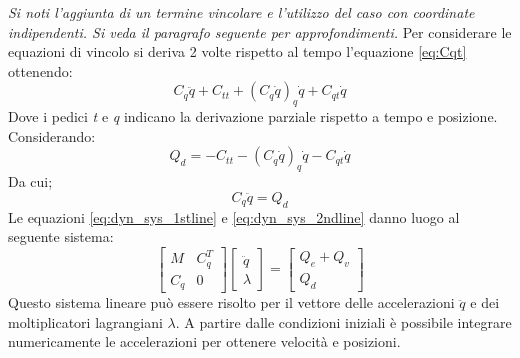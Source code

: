 \textit{Si noti l'aggiunta di un termine vincolare e l'utilizzo del caso con coordinate indipendenti. Si veda il paragrafo seguente per approfondimenti.} \newline
Per considerare le equazioni di vincolo si deriva 2 volte rispetto al tempo l'equazione \ref{eq:Cqt} ottenendo:
\[C_q\ddot{q} + C_{tt} + (C_q\dot{q})_q\dot{q} + C_{qt}\dot{q}\]
Dove i pedici \emph{t} e \emph{q} indicano la derivazione parziale rispetto a tempo e posizione.
Considerando:
\begin{equation} \label{eq:Qd}
Q_d = - C_{tt} - (C_q\dot{q})_q\dot{q} - C_{qt}\dot{q}
\end{equation}
Da cui;
\begin{equation} \label{eq:dyn_sys_2ndline}
C_q\ddot{q} = Q_d
\end{equation}
Le equazioni \ref{eq:dyn_sys_1stline} e \ref{eq:dyn_sys_2ndline} danno luogo al seguente sistema:
\begin{equation} \label{eq:dyn_sys}
\begin{bmatrix} M & C_q^T \\ C_q & 0 \end{bmatrix}
\begin{bmatrix} \ddot{q}\\ \lambda \end{bmatrix} = 
\begin{bmatrix}
Q_e + Q_v \\ Q_d
\end{bmatrix}
\end{equation}
Questo sistema lineare può essere risolto per il vettore delle accelerazioni $\ddot{q}$ e dei moltiplicatori lagrangiani $\lambda$. A partire dalle condizioni iniziali è possibile integrare numericamente le accelerazioni per ottenere velocità e posizioni.
